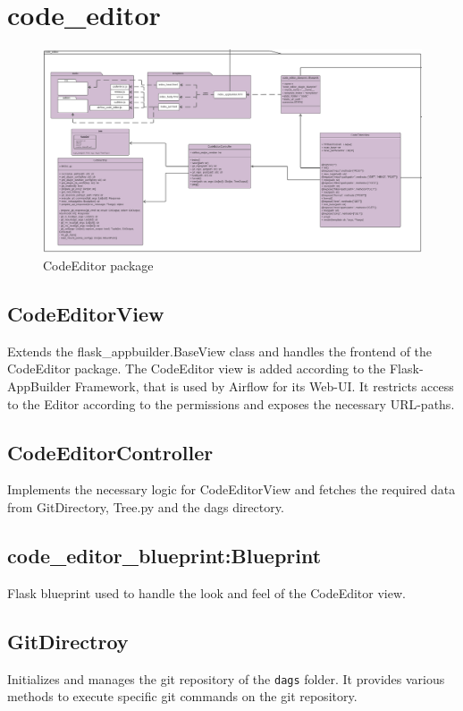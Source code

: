 \section{code\_editor}
\begin{figure} [ht]
    \centering
    \includegraphics[width= \textwidth]{Diagramme/KlassendiagrammAusschnitte/Klassendiagramm -codeEditor.png}
    \caption{CodeEditor package}
    \label{fig:codeEditor section}
\end{figure}

\subsection{CodeEditorView}
Extends the flask\_appbuilder.BaseView class and handles the frontend of the CodeEditor package.
The CodeEditor view is added according to the Flask-AppBuilder Framework, that is used by Airflow for its Web-UI. It restricts access to the Editor according to the permissions and exposes the necessary URL-paths.

\subsection{CodeEditorController}
Implements the necessary logic for CodeEditorView and fetches the required data from GitDirectory, 
Tree.py and the dags directory.  

\subsection{code\_editor\_blueprint:Blueprint}
Flask blueprint used to handle the look and feel of the CodeEditor view.

\subsection{GitDirectroy}
Initializes and manages the git repository of the \verb!dags! folder. It
provides various methods to execute specific git commands on the git repository. 

